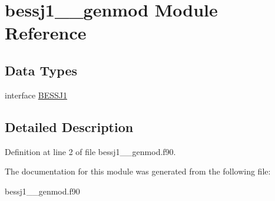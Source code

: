 \hypertarget{classbessj1____genmod}{\section{bessj1\+\_\+\+\_\+genmod Module Reference}
\label{classbessj1____genmod}
}
\subsection*{Data Types}
\begin{DoxyCompactItemize}
\item 
interface \hyperlink{interfacebessj1____genmod_1_1_b_e_s_s_j1}{B\+E\+S\+S\+J1}
\end{DoxyCompactItemize}


\subsection{Detailed Description}


Definition at line 2 of file bessj1\+\_\+\+\_\+genmod.\+f90.



The documentation for this module was generated from the following file\+:\begin{DoxyCompactItemize}
\item 
bessj1\+\_\+\+\_\+genmod.\+f90\end{DoxyCompactItemize}
